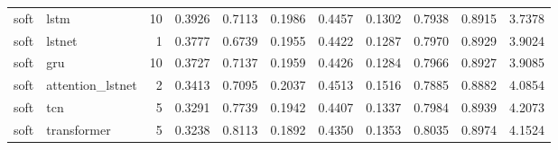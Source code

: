 \begin{table}
\begin{tabular}{llrrrrrrrrr}
soft & lstm & 10 & 0.3926 & 0.7113 & 0.1986 & 0.4457 & 0.1302 & 0.7938 & 0.8915 & 3.7378 \\
soft & lstnet & 1 & 0.3777 & 0.6739 & 0.1955 & 0.4422 & 0.1287 & 0.7970 & 0.8929 & 3.9024 \\
soft & gru & 10 & 0.3727 & 0.7137 & 0.1959 & 0.4426 & 0.1284 & 0.7966 & 0.8927 & 3.9085 \\
soft & attention_lstnet & 2 & 0.3413 & 0.7095 & 0.2037 & 0.4513 & 0.1516 & 0.7885 & 0.8882 & 4.0854 \\
soft & tcn & 5 & 0.3291 & 0.7739 & 0.1942 & 0.4407 & 0.1337 & 0.7984 & 0.8939 & 4.2073 \\
soft & transformer & 5 & 0.3238 & 0.8113 & 0.1892 & 0.4350 & 0.1353 & 0.8035 & 0.8974 & 4.1524 \\
\bottomrule
\end{tabular}
\end{table}
